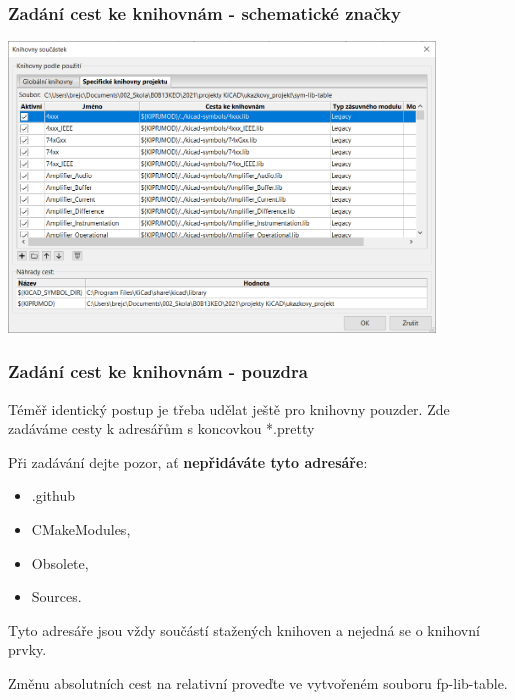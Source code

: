 \documentclass{beamer}
\begin{document}
\begin{frame}
	\frametitle{Zadání cest ke knihovnám - schematické značky}

		\begin{center}
			\includegraphics[width=0.85\textwidth]{obr/knihovny07.png}
		\end{center}
		
\end{frame}
\begin{frame}
	\frametitle{Zadání cest ke knihovnám - pouzdra}
		
		Téměř identický postup je třeba udělat ještě pro knihovny pouzder. Zde zadáváme cesty k adresářům s koncovkou *.pretty
		
		\vspace{3mm}
		Při zadávání dejte pozor, ať \textbf{nepřidáváte tyto adresáře}:
		
		\begin{itemize}
		  \item .github
			\item CMakeModules,
		  \item Obsolete,
			\item Sources.
		\end{itemize}
		
		Tyto adresáře jsou vždy součástí stažených knihoven a nejedná se o knihovní prvky.
		
		\vspace{3mm}
		Změnu absolutních cest na relativní proveďte ve vytvořeném souboru fp-lib-table.
\end{frame}
\end{document}
